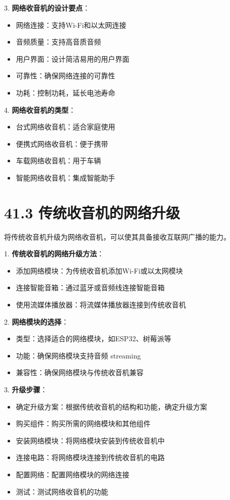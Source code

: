 \documentclass[12pt,UTF8]{ctexbook}
\begin{document}
3. \textbf{网络收音机的设计要点}：
   \begin{itemize}[leftmargin=3.5em]
   \item 网络连接：支持Wi-Fi和以太网连接
   \item 音频质量：支持高音质音频
   \item 用户界面：设计简洁易用的用户界面
   \item 可靠性：确保网络连接的可靠性
   \item 功耗：控制功耗，延长电池寿命
   \end{itemize}

4. \textbf{网络收音机的类型}：
   \begin{itemize}[leftmargin=3.5em]
   \item 台式网络收音机：适合家庭使用
   \item 便携式网络收音机：便于携带
   \item 车载网络收音机：用于车辆
   \item 智能网络收音机：集成智能助手
   \end{itemize}

\section*{41.3 传统收音机的网络升级}

将传统收音机升级为网络收音机，可以使其具备接收互联网广播的能力。

1. \textbf{传统收音机的网络升级方法}：
   \begin{itemize}[leftmargin=3.5em]
   \item 添加网络模块：为传统收音机添加Wi-Fi或以太网模块
   \item 连接智能音箱：通过蓝牙或音频线连接智能音箱
   \item 使用流媒体播放器：将流媒体播放器连接到传统收音机
   \end{itemize}

2. \textbf{网络模块的选择}：
   \begin{itemize}[leftmargin=3.5em]
   \item 类型：选择适合的网络模块，如ESP32、树莓派等
   \item 功能：确保网络模块支持音频 streaming
   \item 兼容性：确保网络模块与传统收音机兼容
   \end{itemize}

3. \textbf{升级步骤}：
   \begin{itemize}[leftmargin=3.5em]
   \item 确定升级方案：根据传统收音机的结构和功能，确定升级方案
   \item 购买组件：购买所需的网络模块和其他组件
   \item 安装网络模块：将网络模块安装到传统收音机中
   \item 连接电路：将网络模块连接到传统收音机的电路
   \item 配置网络：配置网络模块的网络连接
   \item 测试：测试网络收音机的功能
   \end{itemize}
\end{document}
